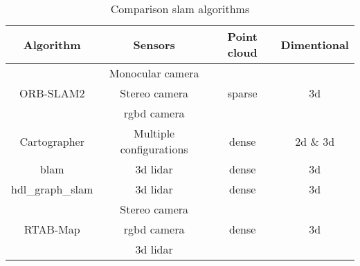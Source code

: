 \begin{table}[!h]
  \centering
  \begin{tabular}{| c | c | c | c |}
    \hline
    \textbf{Algorithm} & \textbf{Sensors} & \textbf{Point cloud} & \textbf{Dimentional}\\
    \hline
    \multirow{3}{*}{ORB\hyp{}SLAM2} & Monocular camera & \multirow{3}{*}{sparse} & \multirow{3}{*}{\acs{3d}}\\
    & Stereo camera & &\\
    & \acs{rgbd} camera & &\\
    \hline
    Cartographer & Multiple configurations & dense & \acs{2d} \& \acs{3d}\\
    \hline
    \acs{blam} & \acs{3d} \acs{lidar} & dense & \acs{3d}\\
    \hline
    hdl\_graph\_slam & \acs{3d} \acs{lidar} & dense & \acs{3d}\\
    \hline
    \multirow{3}{*}{RTAB-Map} & Stereo camera & \multirow{3}{*}{dense} & \multirow{3}{*}{\acs{3d}}\\
    & \acs{rgbd} camera & &\\
    & \acs{3d} \acs{lidar} & &\\
    \hline
  \end{tabular}
  \caption{Comparison \acs{slam} algorithms}
\end{table}